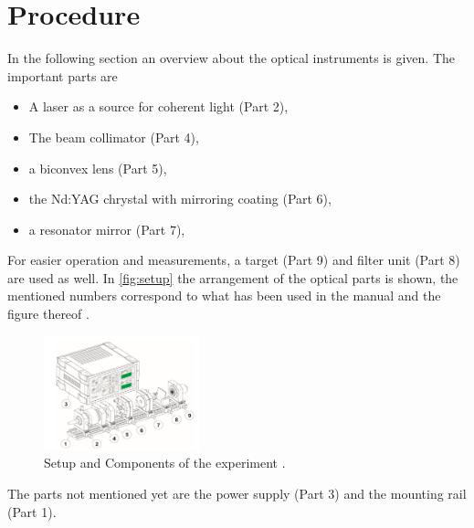 \section{Procedure}
\label{sec:procedure}
In the following section an overview about the optical instruments is given. The important parts are
\begin{itemize}
  \item A laser as a source for coherent light (Part 2),
  \item The beam collimator (Part 4),
  \item a biconvex lens (Part 5),
  \item the Nd:YAG chrystal with mirroring coating (Part 6),
  \item a resonator mirror (Part 7),
\end{itemize}
For easier operation and measurements, a target (Part 9) and filter unit (Part 8) are used as well. 
In \autoref{fig:setup} the arrangement of the optical parts is shown, the mentioned numbers
correspond to what has been used in the manual and the figure thereof \cite{elas_manual}.
\begin{figure}
    \centering
    \includegraphics[width=0.4\textwidth]{media/Setup.png}
    \caption{Setup and Components of the experiment \cite{elas_manual}.}
    \label{fig:setup}
\end{figure}
The parts not mentioned yet are the power supply (Part 3) and the mounting rail (Part 1).

